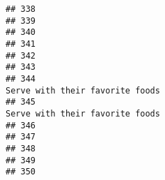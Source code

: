 \documentclass[
]{article}
\begin{document}
\begin{verbatim}
## 338                                                                                                                                                                                                             
## 339                                                                                                                                                                                                             
## 340                                                                                                                                                                                                             
## 341                                                                                                                                                                                                             
## 342                                                                                                                                                                                                             
## 343                                                                                                                                                                                                             
## 344                                                                                                                                                                              Serve with their favorite foods
## 345                                                                                                                                                                              Serve with their favorite foods
## 346                                                                                                                                                                                                             
## 347                                                                                                                                                                                                             
## 348                                                                                                                                                                                                             
## 349                                                                                                                                                                                                             
## 350                                                                                                                                                                                                             

\end{verbatim}
\end{document}
